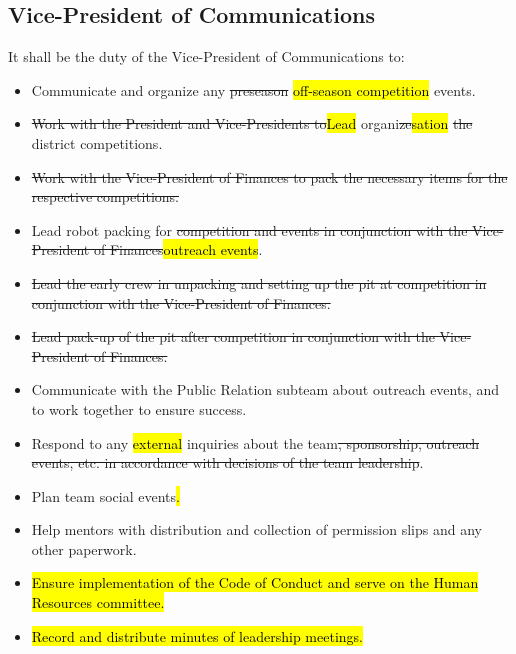\documentclass[12pt, a4paper]{article}
\begin{document}
\subsection{Vice-President of Communications}
It shall be the duty of the Vice-President of Communications to:
\begin{itemize}
\item Communicate and organize any \st{preseason} \hl{off-season competition }events.
\item \st{Work with the President and Vice-Presidents to}\hl{Lead }organi\st{ze}\hl{sation} \st{the} district competitions.
\item \st{Work with the Vice-President of Finances to pack the necessary items for the respective competitions.}
\item Lead robot packing for \st{competition and events in conjunction with the Vice-President of Finances}\hl{outreach events}.
\item \st{Lead the early crew in unpacking and setting up the pit at competition in conjunction with the Vice-President of Finances.}
\item \st{Lead pack-up of the pit after competition in conjunction with the Vice-President of Finances.}
\item Communicate with the Public Relation subteam about outreach events, and to work together to ensure success.
\item Respond to any \hl{external} inquiries about the team\st{, sponsorship, outreach events, etc. in accordance with decisions of the team leadership}.
\item Plan team social events\hl{.}
\item Help mentors with distribution and collection of permission slips and any other paperwork.
\item \hl{Ensure implementation of the Code of Conduct and serve on the Human Resources committee.}
\item \hl{Record and distribute minutes of leadership meetings.}
\end{itemize}
\end{document}
